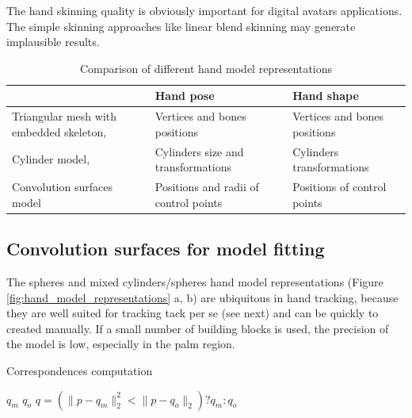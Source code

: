 The hand skinning quality is obviously important for digital avatars applications. The simple skinning approaches like linear blend skinning may generate implausible results.

\begin{table}[!ht] 
	\centering
	\begin{tabular}{|p{2.5cm}|p{2.5cm}|p{2.5cm}|}
	\hline
 	& Hand pose  & Hand shape  \\
	\hline
	Triangular mesh with embedded skeleton, \cite{taylor2014user} & Vertices and bones positions & Vertices and bones positions	 \\
	\hline
	Cylinder model, \cite{tagliasacchi2015robust} & Cylinders size and transformations & Cylinders transformations	 \\
	\hline
	Convolution surfaces model & Positions and radii of control points & Positions of control points \\
	\hline
	\end{tabular}
	\vspace{1em}
	\caption{Comparison of different hand model representations}
	\label{table:representation_dependent_components}
\end{table}

\subsection{Convolution surfaces for model fitting}
The spheres and mixed cylinders/spheres hand model representations (Figure \ref{fig:hand_model_representations} a, b) are ubiquitous in hand tracking, because they are well suited for tracking tack per se (see next) and can be quickly to created manually. If a small number of  building blocks is used, the precision of the model is low, especially in the palm region. 



% 

\begin{algorithm}
\caption{Correspondences computation}
\begin{algorithmic}[1]
    	 \State {} $q_m$
    	 \State {}
    	 \State {} $q_o$
         \State $q=(\|{p - q_m}\|_2^2 < \|{p - q_o}\|_2) ? q_m : q_o$
    \EndFor
\end{algorithmic}
\label{alg:correspondences}
\end{algorithm}

